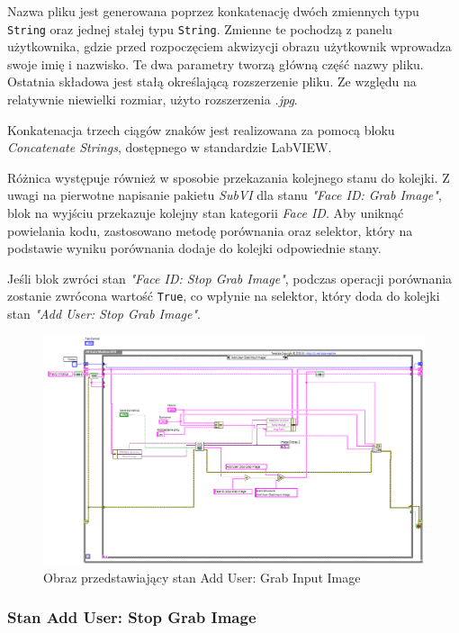 \documentclass{report}
\begin{document}
Nazwa pliku jest generowana poprzez konkatenację dwóch zmiennych typu \texttt{String} oraz jednej stałej typu \texttt{String}. Zmienne te pochodzą z panelu użytkownika, gdzie przed rozpoczęciem akwizycji obrazu użytkownik wprowadza swoje imię i nazwisko. Te dwa parametry tworzą główną część nazwy pliku. Ostatnia składowa jest stałą określającą rozszerzenie pliku. Ze względu na relatywnie niewielki rozmiar, użyto rozszerzenia \textit{.jpg}.

Konkatenacja trzech ciągów znaków jest realizowana za pomocą bloku \textit{Concatenate Strings}, dostępnego w standardzie LabVIEW.

Różnica występuje również w sposobie przekazania kolejnego stanu do kolejki. Z uwagi na pierwotne napisanie pakietu \textit{SubVI} dla stanu \textit{"Face ID: Grab Image"}, blok na wyjściu przekazuje kolejny stan kategorii \textit{Face ID}. Aby uniknąć powielania kodu, zastosowano metodę porównania oraz selektor, który na podstawie wyniku porównania dodaje do kolejki odpowiednie stany.

Jeśli blok zwróci stan \textit{"Face ID: Stop Grab Image"}, podczas operacji porównania zostanie zwrócona wartość \texttt{True}, co wpłynie na selektor, który doda do kolejki stan \textit{"Add User: Stop Grab Image"}.

\begin{figure}[H]
    \centering
    \includegraphics[width=1.0\textwidth]{src/add-user/add-grab.png}
    \caption{Obraz przedstawiający stan Add User: Grab Input Image}
    \label{fig:add-user-grab}
\end{figure}

\subsubsection{\large Stan Add User: Stop Grab Image}
\end{document}
